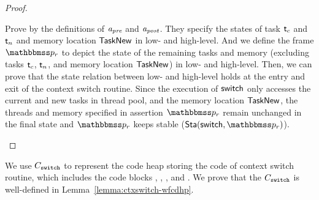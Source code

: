 \begin{proof}
\begin{itemize}
        Prove by the definitions of $\textit{a}_\textit{pre}$ and $\textit{a}_\textit{post}$.
        They specify the states of task $\textsf{t}_c$ and
        $\textsf{t}_n$ and memory location $\mathsf{TaskNew}$
        in low- and high-level. And we define the frame
        $\relastP_r$ to depict the state of the
        remaining tasks and memory
        (excluding tasks $\textsf{t}_c$, $\textsf{t}_n$, and
        memory location $\mathsf{TaskNew}$) in low- and high-level.
        Then, we can prove that the
        state relation between low- and high-level
        holds at the entry and
        exit of the context switch routine.
        Since the execution of $\mathsf{switch}$ only accesses
        the current and new tasks in thread pool, and the
        memory location $\mathsf{TaskNew}$,
        the threads and memory specified in assertion
        $\relastP_r$ remain unchanged
        in the final state and $\relastP_r$ keeps
        stable ($\Sta(\primsw, \relastP_r)$).
    \end{itemize}
\end{proof}

We use $C_{\texttt{switch}}$ to represent the
code heap storing the code of context switch routine,
which includes the code blocks \SwitchEntry{},
\regsave{}, \regrestore{},
\SaveUsedWin{} and \SwitchNewTask{}. We prove that
the $C_{\texttt{switch}}$ is well-defined in
Lemma~\ref{lemma:ctxswitch-wfcdhp}.

